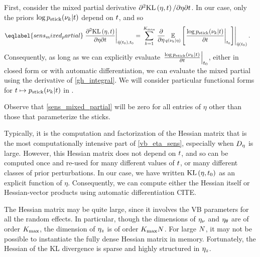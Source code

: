 First, consider the mixed partial derivative $\partial^2 \mathrm{KL}\left(\eta, t\right) /
\partial \eta \partial t$.  In our case, only the priors $\log p_{\mathrm{stick}}(\nu_k
\vert t)$ depend on $t$, and so
%
\begin{align}\eqlabel{sens_mixed_partial}
%
\fracat{\partial^2 \KL{\eta, \t}}
       {\partial \eta \partial \t}
       {\etaopt(\t_0), \t_0} ={}&
\sum_{\k=1}^{\kmax}
    \evalat{
        \frac{\partial}{\partial\eta}
        \expect{\q(\nu_\k \vert \eta)}
               {\fracat{\log \pstick(\nu_\k \vert \t)}{\partial \t}{\t_0}
               }
        }
        {\etaopt(\t_0)}.
%
\end{align}
%
Consequently, as long as we can explicitly evaluate $\left.\frac{\log p_{\mathrm{stick}}(\nu_k
\vert t)}{\partial t}\right\vert_{t_0} $, either in closed form or with automatic
differentiation, we can evaluate the mixed partial using the derivative of
\eqref{gh_integral}.  We will consider particular functional forms for
$t \mapsto p_{\mathrm{stick}}(\nu_k \vert t)$ in .

Observe that \eqref{sens_mixed_partial} will be zero for all entries of
$\eta$ other than those that parameterize the sticks.

Typically, it is the computation and factorization of the Hessian matrix that is
the most computationally intensive part of \eqref{vb_eta_sens}, especially when
$D_{\eta}$ is large.  However, this Hessian matrix does not depend on $t$, and
so can be computed once and re-used for many different values of $t$, or many
different classes of prior perturbations.  In our case, we have written
$\mathrm{KL}\left(\eta, t_0\right)$ as an explicit function of $\eta$.  Consequently, we can
compute either the Hessian itself or Hessian-vector products using automatic
differentiation CITE.

The Hessian matrix may be quite large, since it involves the VB parameters for
all the random effects.  In particular, though the dimensions of $\eta_{\nu}$ and
$\eta_{\theta}$ are of order ${K_{\mathrm{max}}}$, the dimension of $\eta_{z}$ is of order ${K_{\mathrm{max}}}
N$.  For large $N$, it may not be possible to instantiate the fully dense
Hessian matrix in memory.  Fortunately, the Hessian of the KL divergence is
sparse and highly structured in $\eta_{z}$.

%
